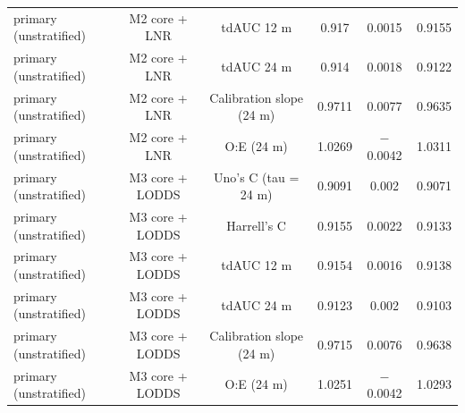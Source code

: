 \begin{table}[htbp]
\begin{tabular*}{\textwidth}{@{\extracolsep{\fill}}lccccc@{}}
primary (unstratified) & M2 core + LNR & tdAUC 12 m & 0.917 & 0.0015 & 0.9155 \\
primary (unstratified) & M2 core + LNR & tdAUC 24 m & 0.914 & 0.0018 & 0.9122 \\
primary (unstratified) & M2 core + LNR & Calibration slope (24 m) & 0.9711 & 0.0077 & 0.9635 \\
primary (unstratified) & M2 core + LNR & O:E (24 m) & 1.0269 & $-$0.0042 & 1.0311 \\
primary (unstratified) & M3 core + LODDS & Uno's C (tau = 24 m) & 0.9091 & 0.002 & 0.9071 \\
primary (unstratified) & M3 core + LODDS & Harrell's C & 0.9155 & 0.0022 & 0.9133 \\
primary (unstratified) & M3 core + LODDS & tdAUC 12 m & 0.9154 & 0.0016 & 0.9138 \\
primary (unstratified) & M3 core + LODDS & tdAUC 24 m & 0.9123 & 0.002 & 0.9103 \\
primary (unstratified) & M3 core + LODDS & Calibration slope (24 m) & 0.9715 & 0.0076 & 0.9638 \\
primary (unstratified) & M3 core + LODDS & O:E (24 m) & 1.0251 & $-$0.0042 & 1.0293 \\
\bottomrule
\end{tabular*}
\smallskip{}
\end{table}
